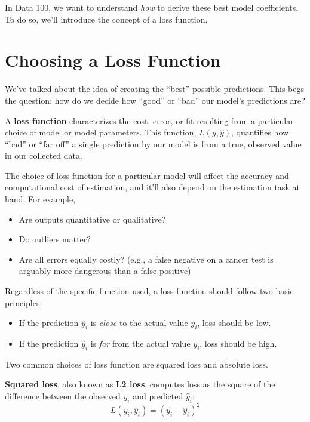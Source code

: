 \documentclass[
  letterpaper,
  DIV=11,
  numbers=noendperiod]{scrreprt}
\providecommand{\tightlist}{%
  \setlength{\itemsep}{0pt}\setlength{\parskip}{0pt}}\usepackage{longtable,booktabs,array}
\begin{document}
In Data 100, we want to understand \emph{how} to derive these best model
coefficients. To do so, we'll introduce the concept of a loss function.

\section{Choosing a Loss Function}\label{choosing-a-loss-function}

We've talked about the idea of creating the ``best'' possible
predictions. This begs the question: how do we decide how ``good'' or
``bad'' our model's predictions are?

A \textbf{loss function} characterizes the cost, error, or fit resulting
from a particular choice of model or model parameters. This function,
\(L(y, \hat{y})\), quantifies how ``bad'' or ``far off'' a single
prediction by our model is from a true, observed value in our collected
data.

The choice of loss function for a particular model will affect the
accuracy and computational cost of estimation, and it'll also depend on
the estimation task at hand. For example,

\begin{itemize}
\tightlist
\item
  Are outputs quantitative or qualitative?
\item
  Do outliers matter?
\item
  Are all errors equally costly? (e.g., a false negative on a cancer
  test is arguably more dangerous than a false positive)
\end{itemize}

Regardless of the specific function used, a loss function should follow
two basic principles:

\begin{itemize}
\tightlist
\item
  If the prediction \(\hat{y}_i\) is \emph{close} to the actual value
  \(y_i\), loss should be low.
\item
  If the prediction \(\hat{y}_i\) is \emph{far} from the actual value
  \(y_i\), loss should be high.
\end{itemize}

Two common choices of loss function are squared loss and absolute loss.

\textbf{Squared loss}, also known as \textbf{L2 loss}, computes loss as
the square of the difference between the observed \(y_i\) and predicted
\(\hat{y}_i\): \[L(y_i, \hat{y}_i) = (y_i - \hat{y}_i)^2\]
\end{document}
